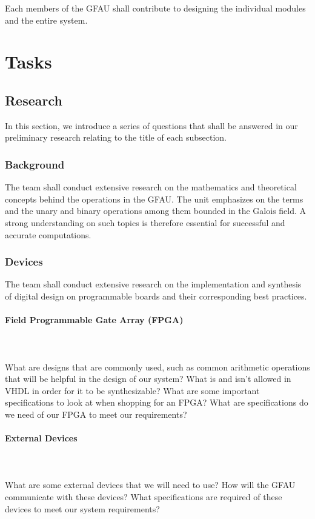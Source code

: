 \documentclass[12pt]{extarticle}
\begin{document}
    Each members of the GFAU shall contribute to designing the individual
    modules and the entire system.

    \section{Tasks}

        \subsection{Research} In this section, we introduce a series of
        questions that shall be answered in our preliminary research relating
        to the title of each subsection.

        \subsubsection{Background} The team shall conduct extensive research on
        the mathematics and theoretical concepts behind the operations in the
        GFAU. The unit emphasizes on the terms and the unary and binary
        operations among them bounded in the Galois field. A strong
        understanding on such topics is therefore essential for successful and
        accurate computations.

        \subsubsection{Devices} The team shall conduct extensive research on
        the implementation and synthesis of digital design on programmable
        boards and their corresponding best practices.
        
            \paragraph{Field Programmable Gate Array (FPGA)} \leavevmode \\~\\
            What are designs that are commonly used, such as common arithmetic
            operations that will be helpful in the design of our system? What
            is and isn't allowed in VHDL in order for it to be synthesizable?
            What are some important specifications to look at when shopping for
            an FPGA? What are specifications do we need of our FPGA to meet our
            requirements?

            \paragraph{External Devices} \leavevmode \\~\\ What are some
            external devices that we will need to use? How will the GFAU
            communicate with these devices? What specifications are required of
            these devices to meet our system requirements?
\end{document}
